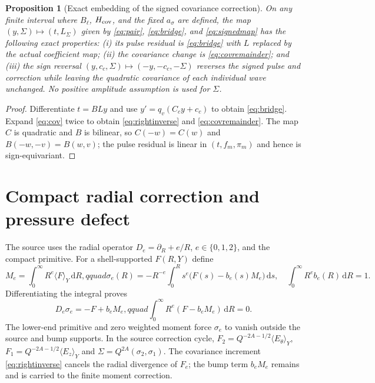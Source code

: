 \documentclass[11pt]{article}
\newtheorem{proposition}{Proposition}
\newcommand{\dd}{\,\mathrm d}
\begin{document}
\begin{proposition}[Exact embedding of the signed covariance correction]
On any finite interval where $B_\ell$, $H_{\rm cov}$, and the fixed $a_\sigma$ are defined,
the map $(y,\Sigma)\mapsto(t,L_\Sigma)$ given by \eqref{eq:pair}, \eqref{eq:bridge}, and
\eqref{eq:signedmap} has the following exact properties: (i) its pulse residual is
\eqref{eq:bridge} with $L$ replaced by the actual coefficient map; (ii) the covariance change
is \eqref{eq:covremainder}; and (iii) the sign reversal $(y,c_c,\Sigma)\mapsto(-y,-c_c,-\Sigma)$
reverses the signed pulse and correction while leaving the quadratic covariance of each
individual wave unchanged.  No positive amplitude assumption is used for $\Sigma$.
\end{proposition}
\begin{proof}
Differentiate $t=B Ly$ and use $y'=q_v(C_cy+c_c)$ to obtain \eqref{eq:bridge}.  Expand
\eqref{eq:cov} twice to obtain \eqref{eq:rightinverse} and \eqref{eq:covremainder}.
The map $C$ is quadratic and $B$ is bilinear, so $C(-w)=C(w)$ and
$B(-w,-v)=B(w,v)$; the pulse residual is linear in $(t,f_m,\pi_m)$ and hence is sign-equivariant.
\end{proof}

\section{Compact radial correction and pressure defect}
The source uses the radial operator $D_e=\partial_R+e/R$, $e\in\{0,1,2\}$, and the
compact primitive.  For a shell-supported $F(R,Y)$ define
\begin{equation}
 M_e=\int_0^\infty R^e\langle F\rangle_Y\dd R,qquad
 \sigma_e(R)=-R^{-e}\int_0^R s^e\bigl(F(s)-b_e(s)M_e\bigr)\dd s,
 \quad \int_0^\infty R^e b_e(R)\dd R=1.\label{eq:radial}
\end{equation}
Differentiating the integral proves
\begin{equation}
 D_e\sigma_e=-F+b_eM_e,qquad
 \int_0^\infty R^e(F-b_eM_e)\dd R=0.\label{eq:radialidentity}
\end{equation}
The lower-end primitive and zero weighted moment force $\sigma_e$ to vanish outside the
source and bump supports.  In the source correction cycle, $F_2=Q^{-2A-1/2}\langle E_\theta\rangle_Y$,
$F_1=Q^{-2A-1/2}\langle E_z\rangle_Y$ and $\Sigma=Q^{2A}(\sigma_2,\sigma_1)$.
The covariance increment \eqref{eq:rightinverse} cancels the radial divergence of $F_e$;
the bump term $b_eM_e$ remains and is carried to the finite moment correction.
\end{document}
